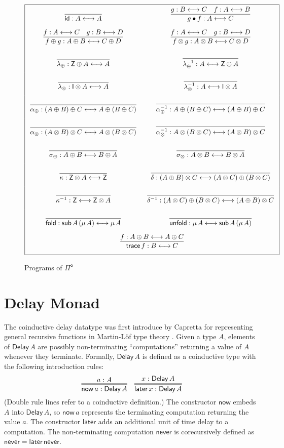 \documentclass[runningheads]{llncs}
\newcommand{\Pio}{$\mathsf{\Pi}^{\mathsf{o}}$}
\newcommand{\id}{\mathsf{id}}
\newcommand{\lr}{\longleftrightarrow}
\newcommand{\fold}{\mathsf{fold}}
\newcommand{\unfold}{\mathsf{unfold}}
\newcommand{\sub}{\mathsf{sub}}
\newcommand{\trace}{\mathsf{trace}}
\newcommand{\Z}{\mathsf{Z}}
\newcommand{\I}{\mathsf{I}}
\newcommand{\Delay}{\mathsf{Delay}\,}
\newcommand{\now}{\mathsf{now}}
\newcommand{\later}{\mathsf{later}}
\newcommand{\never}{\mathsf{never}}
\begin{document}
\begin{figure}
\[
\arraycolsep=8pt\def\arraystretch{2.8}
\begin{array}{|cc|}
\hline
\infer{\id : A \lr A}{}
& \infer{g \bullet f : A \lr C}{g : B \lr C & f : A \lr B} \\
\infer{f \oplus g : A \oplus B \lr C \oplus D}{f : A \lr C & g : B \lr D} 
& \infer{f \otimes g : A \otimes B \lr C \otimes D}{f : A \lr C & g : B \lr D} \\
\infer{\lambda_{\oplus} : \Z \oplus A \lr A}{}
& \infer{\lambda_{\oplus}^{-1} : A \lr \Z \oplus A}{} \\
\infer{\lambda_{\otimes} : \I \otimes A \lr A}{}
& \infer{\lambda_{\otimes}^{-1} : A \lr \I \otimes A}{} \\
\infer{\alpha_{\oplus} : (A \oplus B) \oplus C \lr A \oplus (B \oplus C)}{}
& \infer{\alpha_{\oplus}^{-1} : A \oplus (B \oplus C) \lr (A \oplus B) \oplus C}{} \\
\infer{\alpha_{\otimes} : (A \otimes B) \otimes C \lr A \otimes (B \otimes C)}{}
& \infer{\alpha_{\otimes}^{-1} : A \otimes (B \otimes C) \lr (A \otimes B) \otimes C}{} \\
\infer{\sigma_{\oplus} : A \oplus B \lr B \oplus A}{}
& \infer{\sigma_{\otimes} : A \otimes B \lr B \otimes A}{} \\
\infer{\kappa : \Z \otimes A \lr \Z}{} 
& \infer{\delta : (A \oplus B) \otimes C \lr (A \otimes C) \oplus (B \otimes C)}{} \\
\infer{\kappa^{-1} : \Z \lr \Z \otimes A}{}
& \infer{\delta^{-1} : (A \otimes C) \oplus (B \otimes C)  \lr (A \oplus B) \otimes C}{} \\
\infer{\fold : \sub \, A \, (\mu \,A) \lr \mu \,A}{} 
& \infer{\unfold : \mu\,A \lr \sub \, A \, (\mu \,A)}{} \\
\multicolumn{2}{|c|}{\infer{\trace \,f: B \lr C}{f : A \oplus B \lr A \oplus C}} \\
\hline
\end{array}
\]
\caption{Programs of \Pio}
\label{fig:programs}
\end{figure}

\section{Delay Monad}\label{sec:delay}

The coinductive delay datatype was first introduce by Capretta for
representing general recursive functions in Martin-L\"of type theory
\cite{Capretta05}.  Given a type $A$, elements of $\Delay A$ are
possibly non-terminating ``computations'' returning a value of $A$
whenever they terminate. Formally, $\Delay A$ is defined as a
coinductive type with the following introduction rules:
\[
\infer={\now\,a : \Delay A}{a : A}
\quad
\infer={\later\,x : \Delay A}{x : \Delay A}
\]
(Double rule lines refer to a coinductive definition.) The
constructor $\now$ embeds $A$ into $\Delay A$, so $\now\,a$ represents
the terminating computation returning the value $a$. The constructor
$\later$ adds an additional unit of time delay to a computation. The
non-terminating computation $\never$ is corecursively defined as
$\never = \later \,\never$.
\end{document}
